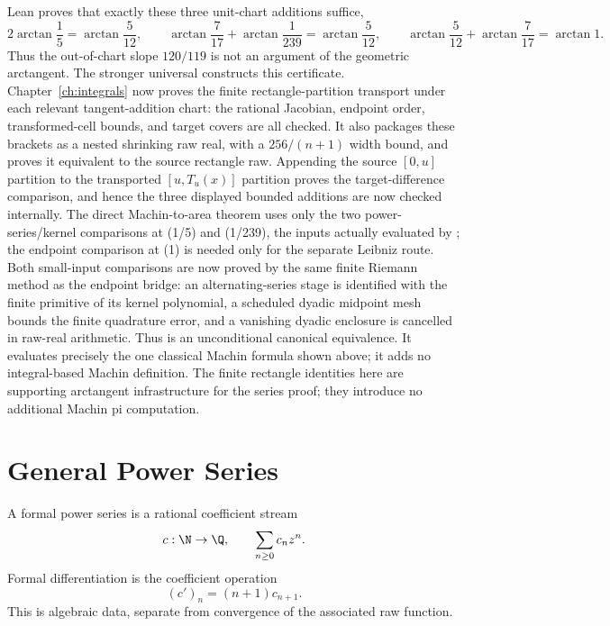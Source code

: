 \begin{theorem}
Lean proves that exactly these three unit-chart additions suffice,
\[
  2\arctan\frac15=\arctan\frac5{12},\qquad
  \arctan\frac7{17}+\arctan\frac1{239}=\arctan\frac5{12},\qquad
  \arctan\frac5{12}+\arctan\frac7{17}=\arctan 1.
\]
Thus the out-of-chart slope \(120/119\) is not an argument of the geometric
arctangent.  The stronger universal
 constructs this certificate.
Chapter~\ref{ch:integrals} now proves the finite rectangle-partition transport
under each relevant tangent-addition chart: the rational Jacobian, endpoint
order, transformed-cell bounds, and target covers are all checked.  It also
packages these brackets as a nested shrinking raw real, with a
\(256/(n+1)\) width bound, and proves it equivalent to the source rectangle
raw.  Appending the source \([0,u]\) partition to the transported
\([u,T_u(x)]\) partition proves the target-difference comparison, and hence
the three displayed bounded additions are now checked internally.
The direct Machin-to-area theorem uses only the two power-series/kernel
comparisons at (1/5) and (1/239), the inputs actually evaluated by
; the endpoint comparison at (1) is needed only for the
separate Leibniz route.  Both small-input comparisons are now proved by the
same finite Riemann method as the endpoint bridge: an alternating-series
stage is identified with the finite primitive of its kernel polynomial, a
scheduled dyadic midpoint mesh bounds the finite quadrature error, and a
vanishing dyadic enclosure is cancelled in raw-real arithmetic.  Thus
 is an unconditional
canonical equivalence.  It evaluates precisely the one classical Machin
formula shown above; it adds no integral-based Machin definition.
The finite rectangle identities here are supporting arctangent infrastructure
for the series proof; they introduce no additional Machin pi computation.
\end{theorem}

\section{General Power Series}

\begin{definition}
\label{def:formal-power-series}
A formal power series is a rational coefficient stream
\[
  c:\N\to\Q,\qquad \sum_{n\ge0}c_nz^n.
\]
Formal differentiation is the coefficient operation
\[
  (c')_n=(n+1)c_{n+1}.
\]
This is algebraic data, separate from convergence of the associated raw
function.
\end{definition}

